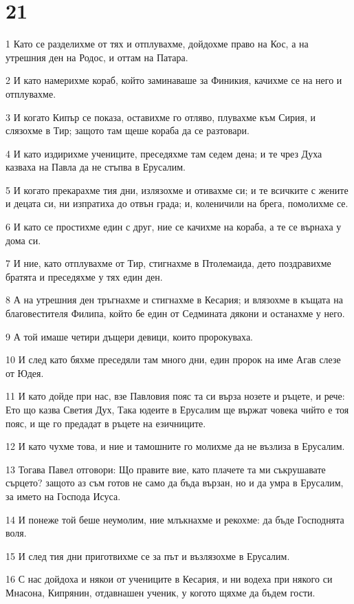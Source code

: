 \chapter{21}

\par 1 Като се разделихме от тях и отплувахме, дойдохме право на Кос, а на утрешния ден на Родос, и оттам на Патара.
\par 2 И като намерихме кораб, който заминаваше за Финикия, качихме се на него и отплувахме.
\par 3 И когато Кипър се показа, оставихме го отляво, плувахме към Сирия, и слязохме в Тир; защото там щеше кораба да се разтовари.
\par 4 И като издирихме учениците, преседяхме там седем дена; и те чрез Духа казваха на Павла да не стъпва в Ерусалим.
\par 5 И когато прекарахме тия дни, излязохме и отивахме си; и те всичките с жените и децата си, ни изпратиха до отвън града; и, коленичили на брега, помолихме се.
\par 6 И като се простихме един с друг, ние се качихме на кораба, а те се върнаха у дома си.
\par 7 И ние, като отплувахме от Тир, стигнахме в Птолемаида, дето поздравихме братята и преседяхме у тях един ден.
\par 8 А на утрешния ден тръгнахме и стигнахме в Кесария; и влязохме в къщата на благовестителя Филипа, който бе един от Седмината дякони и останахме у него.
\par 9 А той имаше четири дъщери девици, които пророкуваха.
\par 10 И след като бяхме преседяли там много дни, един пророк на име Агав слезе от Юдея.
\par 11 И като дойде при нас, взе Павловия пояс та си върза нозете и ръцете, и рече: Ето що казва Светия Дух, Така юдеите в Ерусалим ще вържат човека чийто е тоя пояс, и ще го предадат в ръцете на езичниците.
\par 12 И като чухме това, и ние и тамошните го молихме да не възлиза в Ерусалим.
\par 13 Тогава Павел отговори: Що правите вие, като плачете та ми съкрушавате сърцето? защото аз съм готов не само да бъда вързан, но и да умра в Ерусалим, за името на Господа Исуса.
\par 14 И понеже той беше неумолим, ние млъкнахме и рекохме: да бъде Господнята воля.
\par 15 И след тия дни приготвихме се за път и възлязохме в Ерусалим.
\par 16 С нас дойдоха и някои от учениците в Кесария, и ни водеха при някого си Мнасона, Кипрянин, отдавнашен ученик, у когото щяхме да бъдем гости.
